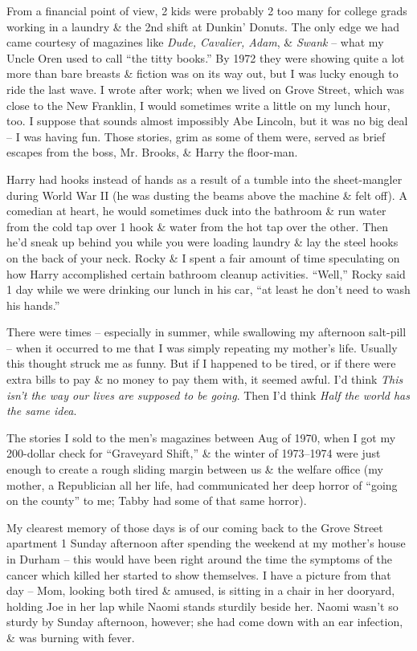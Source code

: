 \documentclass{article}
\numberwithin{equation}{section}
\begin{document}
 From a financial point of view, 2 kids were probably 2 too many for college grads working in a laundry \& the 2nd shift at Dunkin' Donuts. The only edge we had came courtesy of magazines like \textit{Dude, Cavalier, Adam}, \& \textit{Swank} -- what my Uncle Oren used to call ``the titty books.'' By 1972 they were showing quite a lot more than bare breasts \& fiction was on its way out, but I was lucky enough to ride the last wave. I wrote after work; when we lived on Grove Street, which was close to the New Franklin, I would sometimes write a little on my lunch hour, too. I suppose that sounds almost impossibly Abe Lincoln, but it was no big deal -- I was having fun. Those stories, grim as some of them were, served as brief escapes from the boss, Mr. Brooks, \& Harry the floor-man.

Harry had hooks instead of hands as a result of a tumble into the sheet-mangler during World War II (he was dusting the beams above the machine \& felt off). A comedian at heart, he would sometimes duck into the bathroom \& run water from the cold tap over 1 hook \& water from the hot tap over the other. Then he'd sneak up behind you while you were loading laundry \& lay the steel hooks on the back of your neck. Rocky \& I spent a fair amount of time speculating on how Harry accomplished certain bathroom cleanup activities. ``Well,'' Rocky said 1 day while we were drinking our lunch in his car, ``at least he don't need to wash his hands.''

There were times -- especially in summer, while swallowing my afternoon salt-pill -- when it occurred to me that I was simply repeating my mother's life. Usually this thought struck me as funny. But if I happened to be tired, or if there were extra bills to pay \& no money to pay them with, it seemed awful. I'd think \textit{This isn't the way our lives are supposed to be going}. Then I'd think \textit{Half the world has the same idea}.

The stories I sold to the men's magazines between Aug of 1970, when I got my 200-dollar check for ``Graveyard Shift,'' \& the winter of 1973--1974 were just enough to create a rough sliding margin between us \& the welfare office (my mother, a Republician all her life, had communicated her deep horror of ``going on the county'' to me; Tabby had some of that same horror).

My clearest memory of those days is of our coming back to the Grove Street apartment 1 Sunday afternoon after spending the weekend at my mother's house in Durham -- this would have been right around the time the symptoms of the cancer which killed her started to show themselves. I have a picture from that day -- Mom, looking both tired \& amused, is sitting in a chair in her dooryard, holding Joe in her lap while Naomi stands sturdily beside her. Naomi wasn't so sturdy by Sunday afternoon, however; she had come down with an ear infection, \& was burning with fever.
\end{document}
